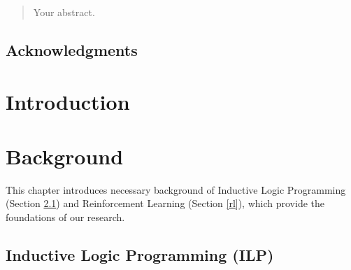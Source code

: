 \documentclass[12pt,twoside]{report}
\date{June 2018}
\theoremstyle{plain}
\theoremstyle{definition}
\begin{document}


\clearpage{\pagestyle{empty}\cleardoublepage}
\setcounter{page}{1}
\pagestyle{fancy}

 \begin{abstract}
 Your abstract.
 \end{abstract}
%
\cleardoublepage
\section*{Acknowledgments}

\clearpage{\pagestyle{empty}\cleardoublepage}

\tableofcontents

\clearpage{\pagestyle{empty}\cleardoublepage}
\setcounter{page}{1}
\fancyhead[LE,RO]{\slshape \rightmark}
\fancyhead[LO,RE]{\slshape \leftmark}

\listoffigures
\listoftables

\chapter{Introduction}
\label{introduction}



\chapter{Background}
\label{background}

This chapter introduces necessary background of Inductive Logic Programming (Section \ref{ilp}) and Reinforcement Learning (Section \ref{rl}), which provide the foundations of our research.

\section{Inductive Logic Programming (ILP)}
\label{ilp}
\end{document}
